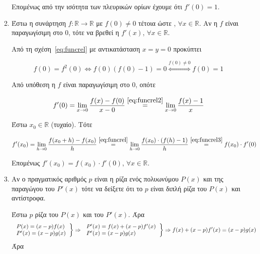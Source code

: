 \begin{enumerate}
		Επομένως από την ισότητα των πλευρικών ορίων έχουμε ότι $ f'(0) = 1 $.
		  
		
		

	\item Έστω η συνάρτηση $ f \colon \mathbb{R} \to \mathbb{R} $ με $ f(0)
		\neq 0	$ τέτοια ώστε , $ \forall x \in \mathbb{R} $.
		Αν η $f$ είναι παραγωγίσιμη στο $0$, τότε να βρεθεί η $
		f'(x) $, $ \forall x \in \mathbb{R} $.



		Από τη σχέση~\eqref{eq:funcrel} με αντικατάσταση $ x=y=0 $ προκύπτει
		
		\begin{equation}\label{eq:funcrel2}
			f(0) = f^{2}(0) \Leftrightarrow f(0)(f(0) - 1) = 0 \overset{f(0)\neq
			0}{\Leftrightarrow} f(0) = 1	
		\end{equation}

		Από υπόθεση η $f$ είναι παραγωγίσιμη στο 0, οπότε

		\begin{equation}\label{eq:funcrel3}
			f'(0) = \lim_{x\to 0} \frac{f(x) - f(0)}{x - 0}
			\overset{\eqref{eq:funcrel2}}{=} \lim_{x\to 0}
			\frac{f(x) - 1}{x} 	
		\end{equation}

		Έστω $ x_{0} \in \mathbb{R} $ (τυχαίο). Τότε

		\[
			f'(x_{0}) = \lim_{h\to 0} \frac{f(x_{0} + h) -
			f(x_{0})}{h}	\overset{\eqref{eq:funcrel}}{=} \lim_{h\to 0} \frac{f(x_{0})\cdot
		(f(h) - 1)}{h} \overset{\eqref{eq:funcrel3}}{=} f(x_{0})\cdot f'(0)
		\]

		Επομένως $ f'(x_{0}) = f(x_{0})\cdot f'(0)$, $ \forall x \in \mathbb{R}
		$.


	\item Αν ο πραγματικός αριθμός $p$ είναι η ρίζα ενός πολυωνύμου $ P(x)
		$ και της παραγώγου του $ P'(x) $ τότε να δείξετε ότι το $p$ είναι διπλή
		ρίζα του $ P(x) $ και αντίστροφα.

		

		Έστω $p$ ρίζα του $ P(x) $ και του $ P'(x) $. Άρα
		\[
			\left.
				\begin{tabular}{l}
			$P(x) = (x-p)f(x)$ \\
			$P'(x) = (x-p)g(x)$
				\end{tabular}
			\right\}\Rightarrow 
			\left.
				\begin{tabular}{l}
			$P'(x) = f(x) + (x-p)f'(x)$ \\
			$P'(x) = (x-p)g(x)$
				\end{tabular}
			\right\}\Rightarrow
			f(x) + (x-p)f'(x) = (x-p)g(x) 
			\]
			Άρα  


\end{enumerate}
